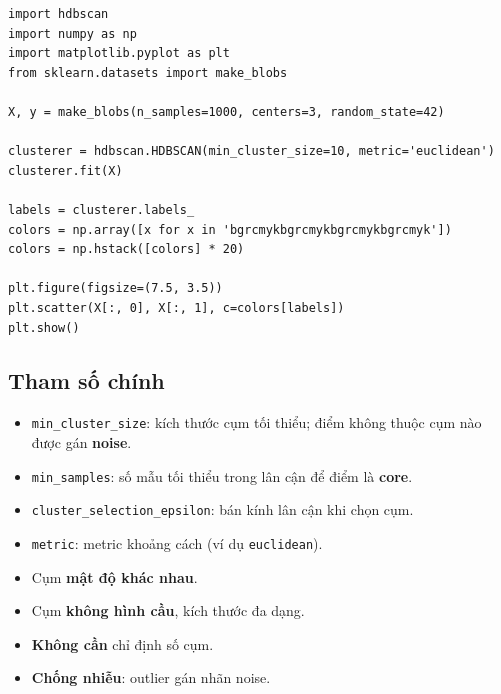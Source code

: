 \begin{vidu}[title={Huấn luyện trên make\_blobs}]
\begin{lstlisting}
import hdbscan
import numpy as np
import matplotlib.pyplot as plt
from sklearn.datasets import make_blobs

X, y = make_blobs(n_samples=1000, centers=3, random_state=42)

clusterer = hdbscan.HDBSCAN(min_cluster_size=10, metric='euclidean')
clusterer.fit(X)

labels = clusterer.labels_
colors = np.array([x for x in 'bgrcmykbgrcmykbgrcmykbgrcmyk'])
colors = np.hstack([colors] * 20)

plt.figure(figsize=(7.5, 3.5))
plt.scatter(X[:, 0], X[:, 1], c=colors[labels])
plt.show()
\end{lstlisting}
\end{vidu}


\subsection{Tham số chính}

\begin{tinhchat}[title={Tham số điều chỉnh}]
\begin{itemize}
  \item \texttt{min\_cluster\_size}: kích thước cụm tối thiểu; điểm không thuộc cụm nào được gán \textbf{noise}.
  \item \texttt{min\_samples}: số mẫu tối thiểu trong lân cận để điểm là \textbf{core}.
  \item \texttt{cluster\_selection\_epsilon}: bán kính lân cận khi chọn cụm.
  \item \texttt{metric}: metric khoảng cách (ví dụ \texttt{euclidean}).
\end{itemize}
\end{tinhchat}

\begin{tinhchat}[title={Ưu điểm}]
\begin{itemize}
  \item Cụm \textbf{mật độ khác nhau}.
  \item Cụm \textbf{không hình cầu}, kích thước đa dạng.
  \item \textbf{Không cần} chỉ định số cụm.
  \item \textbf{Chống nhiễu}: outlier gán nhãn noise.
\end{itemize}
\end{tinhchat}
